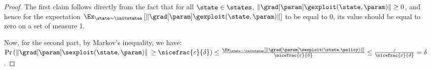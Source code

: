 \begin{proof}
    The first claim follows directly from the fact that for all $\state \in \states$, $\|\grad[\param] \gexploit (\state, \param)\| \geq 0$, and hence for the expectation $ \Ex_{\state \sim \initstates} \left[ \| \grad[\param] \gexploit (\state, \param) \| \right]$ to be equal to $0$, its value should be equal to zero on a set of measure 1.

    Now, for the second part, by Markov's inequality, we have:
    $\Pr \left( \| \grad[\param] \sexploit (\state, \param) \| \, \geq \nicefrac{\varepsilon}{\delta} \right) \leq \frac{\Ex_{\state \sim \initstates} \left[ \| \grad[\param] \sexploit (\state, \policy) \| \right]} {\nicefrac{\varepsilon}{\delta}} \leq \frac{\varepsilon} {\nicefrac{\varepsilon}{\delta}} = \delta$.
\end{proof}



